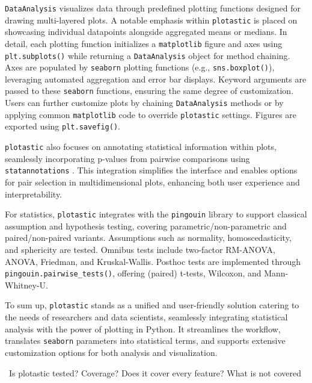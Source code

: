\texttt{DataAnalysis} visualizes data through predefined plotting functions
designed for drawing multi-layered plots. A notable emphasis within
\texttt{plotastic} is placed on showcasing individual datapoints alongside
aggregated means or medians. In detail, each plotting function
initializes a \texttt{matplotlib} figure and axes using \texttt{plt.subplots()} while
returning a \texttt{DataAnalysis} object for method chaining. Axes are
populated by \texttt{seaborn} plotting functions (e.g., \texttt{sns.boxplot()}),
leveraging automated aggregation and error bar displays. Keyword
arguments are passed to these \texttt{seaborn} functions, ensuring the same
degree of customization. Users can further customize plots
by chaining \texttt{DataAnalysis} methods or by applying common \texttt{matplotlib} code
to override \texttt{plotastic} settings. Figures are exported using
\texttt{plt.savefig()}.

\texttt{plotastic} also focuses on annotating statistical information within
plots, seamlessly incorporating p-values from pairwise comparisons using
\texttt{statannotations} \cite{charlierTrevismdStatannotationsV02022}. This
integration simplifies the interface and enables options for pair
selection in multidimensional plots, enhancing both user experience and
interpretability.

For statistics, \texttt{plotastic} integrates with the \texttt{pingouin} library
to support classical assumption and hypothesis testing, covering
parametric/non-parametric and paired/non-paired variants. Assumptions such as
normality, homoscedasticity, and sphericity are tested. Omnibus tests include
two-factor RM-ANOVA, ANOVA, Friedman, and Kruskal-Wallis. Posthoc tests are
implemented through \texttt{pingouin.pairwise\_tests()}, offering (paired)
t-tests, Wilcoxon, and Mann-Whitney-U.

To sum up, \texttt{plotastic} stands as a unified and user-friendly solution
catering to the needs of researchers and data scientists, seamlessly
integrating statistical analysis with the power of plotting in Python.
It streamlines the workflow, translates \texttt{seaborn} parameters into
statistical terms, and supports extensive customization options for both
analysis and visualization.








\label{C2:discussion}
\
Is plotastic tested? Coverage? Does it cover every feature? What is not covered

